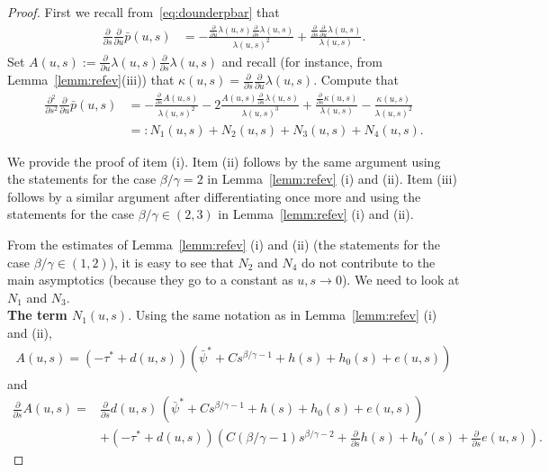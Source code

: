 \documentclass[10pt,a4paper]{amsart}
\begin{document}
\begin{proof} First we recall from~\eqref{eq:dounderpbar} that
\begin{align*}
 \frac{\partial}{\partial s}\frac{\partial}{\partial u}\bar p(u,s)
  &=  -\frac{\frac{\partial}{\partial u}\lambda(u,s)\frac{\partial}{\partial s}\lambda(u,s)}{\lambda(u,s)^2}+\frac{\frac{\partial}{\partial s}\frac{\partial}{\partial u}\lambda(u,s)}{\lambda(u,s)}.
\end{align*}
Set $A(u,s):=\frac{\partial}{\partial u}\lambda(u,s)\frac{\partial}{\partial s}\lambda(u,s)$ and recall (for instance, from Lemma~\ref{lemm:refev}(iii)) that 
$\kappa(u,s)=\frac{\partial}{\partial s}\frac{\partial}{\partial u}\lambda(u,s)$.
Compute that
\begin{align*}
 \frac{\partial^2}{\partial s^2}\frac{\partial}{\partial u}\bar p(u,s)
  &=  -\frac{\frac{\partial}{\partial s}A(u,s)}{\lambda(u,s)^2}-2\frac{A(u,s)\frac{\partial}{\partial s}\lambda(u,s) }{\lambda(u,s)^3}
  +\frac{\frac{\partial}{\partial s}\kappa(u,s)}{\lambda(u,s)}-\frac{\kappa(u,s)}{\lambda(u,s)^2}\\
  &=:N_1(u,s)+N_2(u,s)+N_3(u,s)+N_4(u,s).
\end{align*}


We provide the proof of item (i). Item (ii) follows by the same argument using the statements for the case $\beta/\gamma=2$ in Lemma~\ref{lemm:refev} (i) and (ii). Item (iii) follows by a similar argument after differentiating once more and using the statements for the case $\beta/\gamma\in (2,3)$ in Lemma~\ref{lemm:refev} (i) and (ii). 

From the estimates of Lemma~\ref{lemm:refev} (i) and (ii) (the statements for the case $\beta/\gamma\in (1,2)$), it is easy to see that $N_2$ and $N_4$
do not contribute to the main asymptotics (because they go to a constant as $u,s\to 0$). We need to look at  $N_1$ and $N_3$.\\


 
 
\textbf{The term $N_1(u,s)$}.
Using the same notation as in Lemma~\ref{lemm:refev} (i) and (ii),
\begin{align*}
A(u,s)=
\left(-\tau^*+d(u,s)\right)\left(\bar\psi^*+ C s^{\beta/\gamma-1}+h(s)+h_0(s) +e(u,s) \right)
\end{align*}
and 
\begin{align*}
\frac{\partial}{\partial s} A(u,s)=&
\frac{\partial}{\partial s} d(u,s)\, \left(\bar\psi^*+ C s^{\beta/\gamma-1}+h(s)+h_0(s)  +e(u,s) \right)\\
&+ \left(-\tau^*+d(u,s)\right)\left( C(\beta/\gamma-1) s^{\beta/\gamma-2}+\frac{\partial}{\partial s} h(s)+h_0'(s)  +\frac{\partial}{\partial s} e(u,s) \right).\end{align*}



\end{proof}
\end{document}
